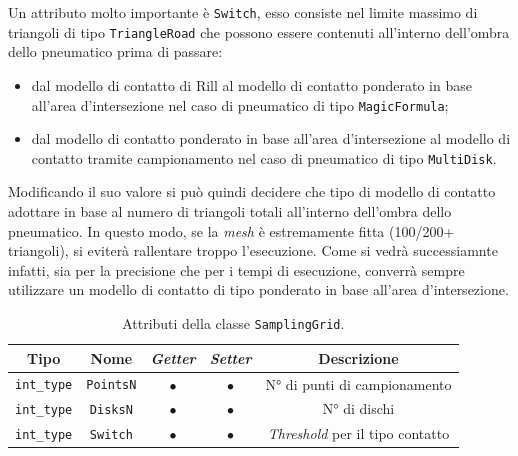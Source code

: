 Un attributo molto importante è \texttt{Switch}, esso consiste nel limite massimo di triangoli di tipo \texttt{TriangleRoad} che possono essere contenuti all'interno dell'ombra dello pneumatico prima di passare:
\begin{itemize}
	\item dal modello di contatto di Rill al modello di contatto ponderato in base all'area d'intersezione nel caso di pneumatico di tipo \texttt{MagicFormula};
	\item dal modello di contatto ponderato in base all'area d'intersezione al modello di contatto tramite campionamento nel caso di pneumatico di tipo \texttt{MultiDisk}.
\end{itemize}
Modificando il suo valore si può quindi decidere che tipo di modello di contatto adottare in base al numero di triangoli totali all'interno dell'ombra dello pneumatico. In questo modo, se la \textit{mesh} è estremamente fitta (100/200+ triangoli), si eviterà rallentare troppo l'esecuzione. Come si vedrà successiamnte infatti, sia per la precisione che per i tempi di esecuzione, converrà sempre utilizzare un modello di contatto di tipo ponderato in base all'area d'intersezione.
%
\begin{table}[h!]
	\centering
	\begin{tabular}{|c|c|c|c|c|}
		\hline 
		\textbf{Tipo} & \textbf{Nome} & \textit{\textbf{Getter}} & \textit{\textbf{Setter}} & \textbf{Descrizione} \\ \hline 
		\texttt{int\_type} & \texttt{PointsN} & $\bullet$ & $\bullet$ & N° di punti di campionamento \\ \hline 
		\texttt{int\_type} & \texttt{DisksN} & $\bullet$ & $\bullet$ & N° di dischi \\ \hline 
		\texttt{int\_type} & \texttt{Switch} & $\bullet$ & $\bullet$ & \textit{Threshold} per il tipo contatto \\ \hline
	\end{tabular}
	\caption{Attributi della classe \texttt{SamplingGrid}.}
	\label{}
\end{table}
%
